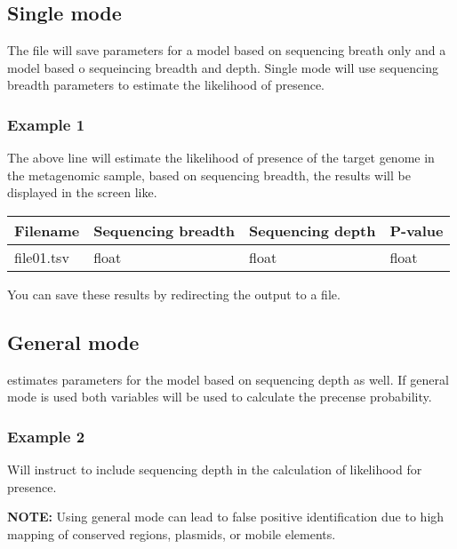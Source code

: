 \documentclass[letterpaper,10pt,english]{sphinxmanual}
\begin{document}
\subsection{Single mode}
\label{probEstimate:single-mode}
The  file will save parameters for a model based on sequencing breath only and a model based o sequeincing breadth and depth. Single mode will use sequencing breadth parameters to estimate the likelihood of presence.


\subsubsection{Example 1}
\label{probEstimate:example-1}

The above line will estimate the likelihood of presence of the target genome in the metagenomic sample, based on sequencing breadth, the results will be displayed in the screen like.

\noindent\begin{tabulary}{\linewidth}{|L|L|L|L|}
\hline

Filename
&
Sequencing breadth
&
Sequencing depth
&
P-value
\\
\hline
file01.tsv
&
float
&
float
&
float
\\
\hline\end{tabulary}


You can save these results by redirecting the output to a file.



\subsection{General mode}
\label{probEstimate:general-mode}
 estimates parameters for the model based on sequencing depth as well. If general mode is used both variables will be used to calculate the precense probability.


\subsubsection{Example 2}
\label{probEstimate:example-2}

Will instruct  to include sequencing depth in the calculation of likelihood for presence.

\textbf{NOTE:} Using general mode can lead to false positive identification due to high mapping of conserved regions, plasmids, or mobile elements.



\renewcommand{\indexname}{Index}
\printindex
\end{document}
